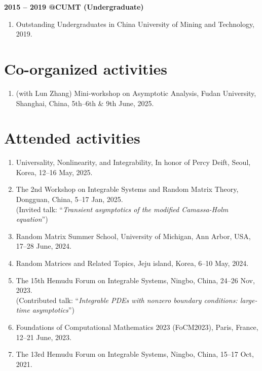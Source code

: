 \documentclass[margin]{res}
\begin{document}
\begin{resume}
\textbf{2015 -- 2019 @CUMT (Undergraduate)}
\begin{enumerate}[--]
    \item Outstanding Undergraduates in China University of Mining and Technology, 2019.
\end{enumerate}


\section{Co-organized activities}
\begin{enumerate}[--]
    \item (with Lun Zhang) Mini-workshop on Asymptotic Analysis, Fudan University, Shanghai, China, 5th--6th \& 9th June, 2025.
\end{enumerate}

\section{Attended activities}
\begin{enumerate}[--]
\item Universality, Nonlinearity, and Integrability, In honor of Percy Deift, Seoul, Korea, 12--16 May, 2025.
\item The 2nd Workshop on Integrable Systems and Random Matrix Theory, Dongguan, China, 5--17 Jan, 2025. \\ (Invited talk: ``{\sl Transient asymptotics of the modified Camassa-Holm equation}'')
\item Random Matrix Summer School, University of Michigan, Ann Arbor, USA, 17--28 June, 2024.
\item Random Matrices and Related Topics, Jeju island, Korea, 6--10 May, 2024.
\item The 15th Hemudu Forum on Integrable Systems, Ningbo, China, 24--26 Nov, 2023. \\ (Contributed talk: ``{\sl Integrable PDEs with nonzero boundary conditions: large-time asymptotics}'')
\item Foundations of Computational Mathematics 2023 (FoCM2023), Paris, France, 12--21 June, 2023.
\item The 13rd Hemudu Forum on Integrable Systems, Ningbo, China, 15--17 Oct, 2021.
\end{enumerate}



\end{resume}
\end{document}
